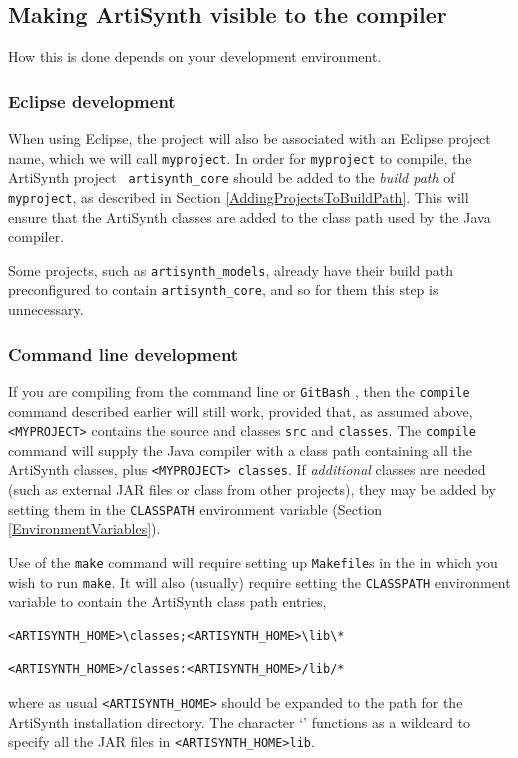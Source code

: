 \subsection{Making ArtiSynth visible to the compiler}

How this is done depends on your development environment.

\subsubsection{Eclipse development}

When using Eclipse, the project will also be associated with an
Eclipse project name, which we will call {\tt myproject}.  In order
for {\tt myproject} to compile, the ArtiSynth project {\tt
artisynth\_core} should be added to the {\it build path} of {\tt
myproject}, as described in
Section \ref{AddingProjectsToBuildPath}. This will ensure that the
ArtiSynth classes are added to the class path used by the Java
compiler.

\begin{sideblock}
Some projects, such as {\tt artisynth\_models}, already have their
build path preconfigured to contain {\tt artisynth\_core}, and so for
them this step is unnecessary.
\end{sideblock}

\subsubsection{Command line development}
\label{CommandLineDevel}

If you are compiling from the command line 
\ifWindows
or {\tt GitBash}%
\fi
, then the {\tt compile} command described earlier will still work,
provided that, as assumed above, {\tt <MYPROJECT>} contains the source
and classes \directories{} {\tt src\SEP} and {\tt classes\SEP}. The
{\tt compile} command will supply the Java compiler with a class path
containing all the ArtiSynth classes, plus {\tt <MYPROJECT>\SEP
classes}. If {\it additional} classes are needed (such as external
JAR files or class \directories{} from other projects), they
may be added by setting them in the {\tt CLASSPATH} environment
variable (Section \ref{EnvironmentVariables}).

Use of the {\tt make} command will require setting up {\tt Makefile}s
in the \directories{} in which you wish to run {\tt make}. It will
also (usually) require setting the {\tt CLASSPATH} environment
variable to contain the ArtiSynth
class path entries,
\ifWindows
\begin{verbatim}
<ARTISYNTH_HOME>\classes;<ARTISYNTH_HOME>\lib\*
\end{verbatim}
\else
\begin{verbatim}
<ARTISYNTH_HOME>/classes:<ARTISYNTH_HOME>/lib/*
\end{verbatim}
\fi
where as usual {\tt <ARTISYNTH\_HOME>} should be expanded to the path
for the ArtiSynth installation directory.  The character `{\tt *}'
functions as a wildcard to specify all the JAR files in
{\tt <ARTISYNTH\_HOME>\SEP lib}.

